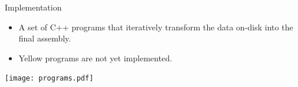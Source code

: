 \documentclass[xcolor=dvipsnames]{beamer}
\begin{document}
\begin{frame}{Implementation}
	\begin{minipage}{0.3\textwidth}
		\begin{itemize}
			\item A set of C++ programs that iteratively transform
			the data on-disk into the final assembly.
			\item Yellow programs are not yet implemented.
		\end{itemize}
	\end{minipage}
	\begin{minipage}{0.67\textwidth}
		\texttt{[image: programs.pdf]}
	\end{minipage}
\end{frame}







\end{document}
